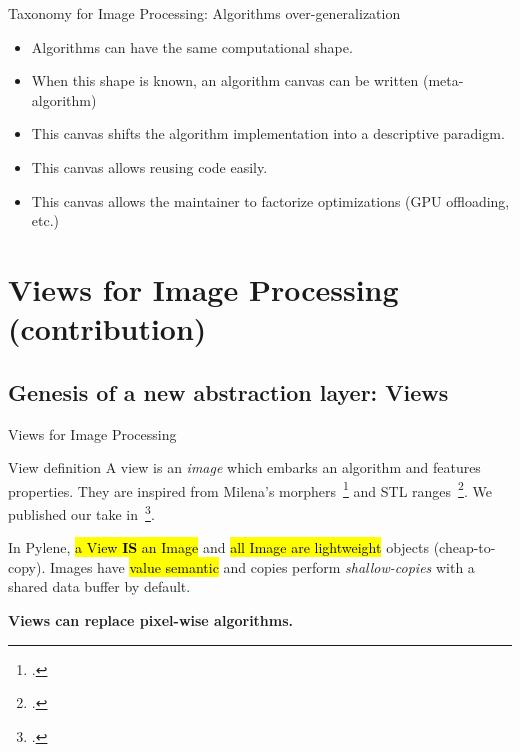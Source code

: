\documentclass[12pt,aspectratio=169]{beamer}
\makeatletter
\let\HL\hl
\renewcommand\hl{%
  \let\set@color\beamerorig@set@color
  \let\reset@color\beamerorig@reset@color
  \HL}
\makeatother
\begin{document}
\begin{frame}[fragile]{Taxonomy for Image Processing: Algorithms over-generalization}
  \begin{itemize}
    \item Algorithms can have the same computational shape.
    \item When this shape is known, an algorithm canvas can be written (meta-algorithm)
    \item This canvas shifts the algorithm implementation into a descriptive paradigm.
    \item This canvas allows reusing code easily.
    \item This canvas allows the maintainer to factorize optimizations (GPU offloading, etc.)
  \end{itemize}
\end{frame}

%
%
%
\section[Views for Image Processing (contribution)]{Views for Image Processing (contribution)}

\subsection{Genesis of a new abstraction layer: Views}

\begin{frame}[fragile]{Views for Image Processing}
  \begin{alertblock}{View definition}
    A view is an \emph{image} which embarks an algorithm and features properties. They are inspired from Milena's
    morphers~\footcite{levillain.2009.ismm} and STL ranges~\footcite{niebler.2014.ranges}. We published our take
    in~\footcite{roynard.2022.gpce}.

    In Pylene, \hl{a View \textbf{IS} an Image} and \hl{all Image are lightweight} objects (cheap-to-copy). Images have
    \hl{value semantic} and copies perform \emph{shallow-copies} with a shared data buffer by default.
  \end{alertblock}
  \begin{center}\textbf{Views can replace pixel-wise algorithms.}\end{center}
\end{frame}
\end{document}
